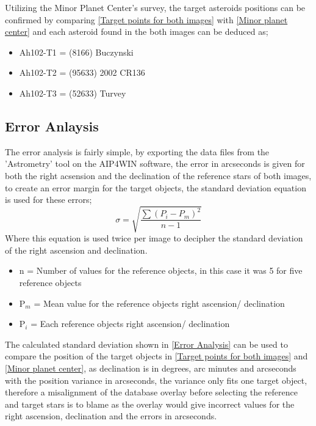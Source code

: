 \documentclass[12pt]{article}
\begin{document}
Utilizing the Minor Planet Center's survey, the target asteroids positions can be confirmed by comparing \cref{Target points for both images} with \cref{Minor planet center} and each asteroid found in the both images can be deduced as; 
\begin{itemize}
    \item Ah102-T1 = (8166) Buczynski
    \item Ah102-T2 = (95633) 2002 CR136
    \item Ah102-T3 = (52633) Turvey
\end{itemize}

\subsection{Error Anlaysis}
\label{Subsection 2b}

The error analysis is fairly simple, by exporting the data files from the 'Astrometry' tool on the AIP4WIN software, the error in arcseconds is given for both the right acsension and the declination of the reference stars of both images, to create an error margin for the target objects, the standard deviation equation is used for these errors; \\

\begin{equation}
\sigma = \sqrt{\dfrac{\sum (P_i - P_m)^2}{n-1}}
\end{equation}
Where this equation is used twice per image to decipher the standard deviation of the right ascension and declination. 
\begin{itemize}
    \item n = Number of values for the reference objects, in this case it was 5 for five reference objects
    \item P$_m$ = Mean value for the reference objects right ascension/ declination
    \item P$_i$ = Each reference objects right ascension/ declination 
\end{itemize}

The calculated standard deviation shown in \cref{Error Analysis} can be used to compare the position of the target objects in \cref{Target points for both images} and \cref{Minor planet center}, as declination is in degrees, arc minutes and arcseconds with the position variance in arcseconds, the variance only fits one target object, therefore a misalignment of the database overlay before selecting the reference and target stars is to blame as the overlay would give incorrect values for the right ascension, declination and the errors in arcseconds. 
\end{document}
